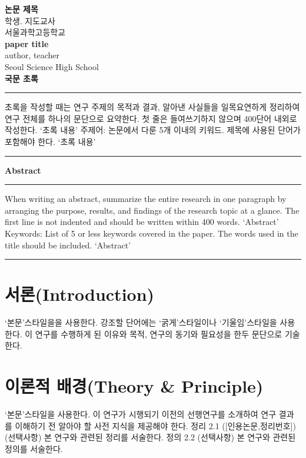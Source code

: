 \documentclass[10pt]{article}
\begin{document}
\begin{center}
{ \LARGE \bf    논문 제목 }\\[12pt]
 학생. 지도교사 \\
 서울과학고등학교
\\[12pt]
{ \LARGE \bf    paper title }\\[12pt]
 author, teacher \\
 Seoul Science High School
  \\[12pt]
{\large \bf  국문 초록}
  \noindent\rule{\textwidth}{0.4pt}
%
  \begin{flushleft}  
  초록을 작성할 때는 연구 주제의 목적과 결과, 알아낸 사실들을 일목요연하게 정리하여 연구 전체를 하나의 문단으로 요약한다. 첫 줄은 들여쓰기하지 않으며 400단어 내외로 작성한다. ‘초록 내용’
주제어: 논문에서 다룬 5개 이내의 키워드. 제목에 사용된 단어가 포함해야 한다. ‘초록 내용’
  \noindent\rule{\textwidth}{0.4pt}
\end{flushleft}  
{\large \bf Abstract}
  \noindent\rule{\textwidth}{0.4pt}
    \begin{flushleft}  
When writing an abstract, summarize the entire research in one paragraph by arranging the purpose, results, and findings of the research topic at a glance. The first line is not indented and should be written within 400 words. ‘Abstract’
Keywords: List of 5 or less keywords covered in the paper. The words used in the title should be included.  ‘Abstract’
  \noindent\rule{\textwidth}{0.4pt}
\end{flushleft} 
  \end{center} 

 
\section{\large \bf 서론(Introduction) }
‘본문’스타일을을 사용한다. 강조할 단어에는 ‘굵게’스타일이나 ‘기울임’스타일을 사용한다. 
이 연구를 수행하게 된 이유와 목적, 연구의 동기와 필요성을 한두 문단으로 기술한다. 


\section{\large \bf 이론적 배경(Theory \& Principle)}
‘본문’스타일을 사용한다. 
이 연구가 시행되기 이전의 선행연구를 소개하여 연구 결과를 이해하기 전 알아야 할 사전 지식을 제공해야 한다. 
정리 2.1 ([인용논문,정리번호]) (선택사항) 본 연구와 관련된 정리를 서술한다.
정의 2.2 (선택사항) 본 연구와 관련된 정의를 서술한다.
 
\end{document}
